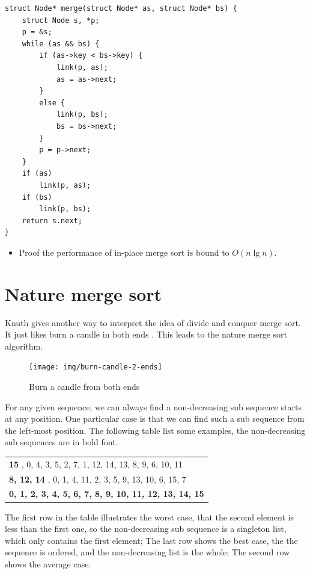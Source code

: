 \documentclass[b5paper]{article}
\begin{document}
\lstset{language=C}
\begin{lstlisting}
struct Node* merge(struct Node* as, struct Node* bs) {
    struct Node s, *p;
    p = &s;
    while (as && bs) {
        if (as->key < bs->key) {
            link(p, as);
            as = as->next;
        }
        else {
            link(p, bs);
            bs = bs->next;
        }
        p = p->next;
    }
    if (as)
        link(p, as);
    if (bs)
        link(p, bs);
    return s.next;
}
\end{lstlisting}

\begin{Exercise}
\begin{itemize}
\item Proof the performance of in-place merge sort is bound to $O(n \lg n)$.
\end{itemize}
\end{Exercise}

\section{Nature merge sort}
Knuth gives another way to interpret the idea of divide and conquer merge sort. It just likes
burn a candle in both ends \cite{TAOCP}. This leads to the nature merge sort algorithm.

\begin{figure}[htbp]
 \centering
 \texttt{[image: img/burn-candle-2-ends]}
 \caption{Burn a candle from both ends}
 \label{fig:burn-candle}
\end{figure}

For any given sequence, we can always find a non-decreasing sub sequence starts at any position.
One particular case is that we can find such a sub sequence from the left-most position. The following
table list some examples, the non-decreasing sub sequences are in bold font.

\begin{tabular}{ | l |}
\hline
{\bf 15 } , 0, 4, 3, 5, 2, 7, 1, 12, 14, 13, 8, 9, 6, 10, 11 \\
{\bf 8, 12, 14 }, 0, 1, 4, 11, 2, 3, 5, 9, 13, 10, 6, 15, 7 \\
{\bf 0, 1, 2, 3, 4, 5, 6, 7, 8, 9, 10, 11, 12, 13, 14, 15 } \\
\hline
\end{tabular}

The first row in the table illustrates the worst case, that the second element is less than the first one,
so the non-decreasing sub sequence is a singleton list, which only contains the first element;
The last row shows the best case, the the sequence is ordered, and the non-decreasing list is the whole;
The second row shows the average case.
\end{document}
